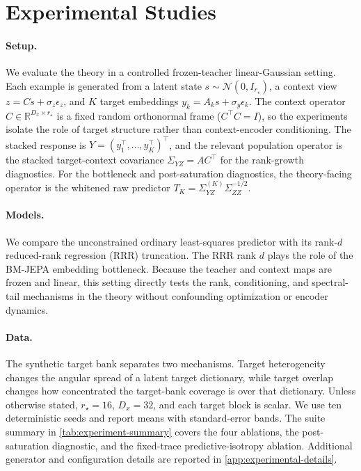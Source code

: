 \section{Experimental Studies}
\label{sec:experiments}


\paragraph{Setup.}
We evaluate the theory in a controlled frozen-teacher linear-Gaussian setting.
Each example is generated from a latent state $s\sim\mathcal{N}(0,I_{r_\star})$,
a context view $z=Cs+\sigma_z\epsilon_z$, and $K$ target embeddings
$y_k=A_ks+\sigma_y\epsilon_k$. The context operator
$C\in\mathbb{R}^{D_x\times r_\star}$ is a fixed random orthonormal frame
($C^\top C=I$), so the experiments isolate the role of target structure rather
than context-encoder conditioning. The stacked response is
$Y=(y_1^\top,\ldots,y_K^\top)^\top$, and the relevant population operator is the
stacked target-context covariance $\Sigma_{YZ}=AC^\top$ for the rank-growth
diagnostics. For the bottleneck and post-saturation diagnostics, the
theory-facing operator is the whitened raw predictor
$T_K=\Sigma_{YZ}^{(K)}\Sigma_{ZZ}^{-1/2}$.

\paragraph{Models.}
We compare the unconstrained ordinary least-squares predictor with its
rank-$d$ reduced-rank regression (RRR) truncation. The RRR rank $d$ plays the
role of the BM-JEPA embedding bottleneck. Because the teacher and context maps
are frozen and linear, this setting directly tests the rank, conditioning, and
spectral-tail mechanisms in the theory without confounding optimization or
encoder dynamics.

\paragraph{Data.}
The synthetic target bank separates two mechanisms. Target heterogeneity changes
the angular spread of a latent target dictionary, while target overlap changes
how concentrated the target-bank coverage is over that dictionary. Unless
otherwise stated, $r_\star=16$, $D_x=32$, and each target block is scalar. We use
ten deterministic seeds and report means with standard-error bands. The suite
summary in \cref{tab:experiment-summary} covers the four ablations, the
post-saturation diagnostic, and the fixed-trace predictive-isotropy ablation.
Additional generator and configuration details are reported in
\cref{app:experimental-details}.

